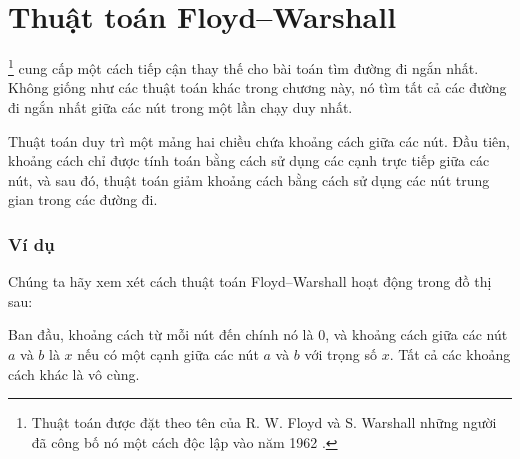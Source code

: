 \section{Thuật toán Floyd–Warshall}


\footnote{Thuật toán
được đặt theo tên của R. W. Floyd và S. Warshall
những người đã công bố nó một cách độc lập vào năm 1962 \cite{flo62,war62}.}
cung cấp một cách tiếp cận thay thế cho bài toán
tìm đường đi ngắn nhất.
Không giống như các thuật toán khác trong chương này,
nó tìm tất cả các đường đi ngắn nhất giữa các nút
trong một lần chạy duy nhất.

Thuật toán duy trì một mảng hai chiều
chứa khoảng cách giữa các nút.
Đầu tiên, khoảng cách chỉ được tính toán bằng cách sử dụng
các cạnh trực tiếp giữa các nút,
và sau đó, thuật toán giảm khoảng cách
bằng cách sử dụng các nút trung gian trong các đường đi.

\subsubsection{Ví dụ}

Chúng ta hãy xem xét cách thuật toán Floyd–Warshall
hoạt động trong đồ thị sau:

\begin{center}
\end{center}

Ban đầu, khoảng cách từ mỗi nút đến chính nó là $0$,
và khoảng cách giữa các nút $a$ và $b$ là $x$
nếu có một cạnh giữa các nút $a$ và $b$ với trọng số $x$.
Tất cả các khoảng cách khác là vô cùng.

